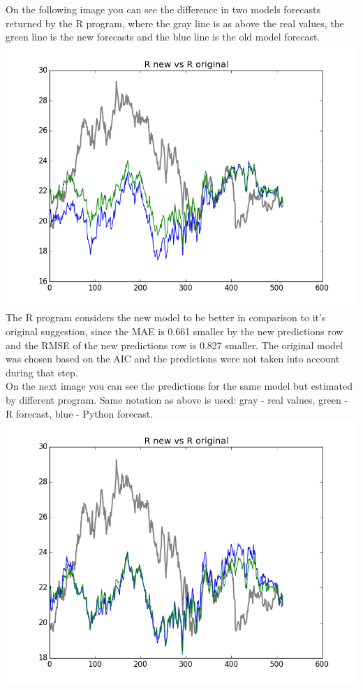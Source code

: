 \documentclass{article}
\begin{document}
On the following image you can see the difference in two models forecasts returned by the R program, where the gray line is as above the real values, the green line is the new forecasts and the blue line is the old model forecast.\\
\includegraphics[scale=0.75]{ROriginalVsNew.png}\\
The R program considers the new model to be better in comparison to it's original suggestion, since the MAE is 0.661 smaller by the new predictions row and the RMSE of the new predictions row is 0.827 smaller. The original model was chosen based on the AIC and the predictions were not taken into account during that step.\\
On the next image you can see the predictions for the same model but estimated by different program. Same notation as above is used: gray - real values, green - R forecast, blue - Python forecast.\\
\includegraphics[scale=0.75]{PythonOriginalVsRNew.png}
\end{document}
